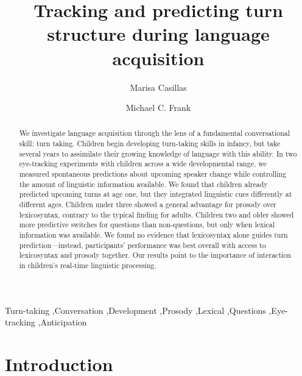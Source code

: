\documentclass[authoryear, 12pt]{elsarticle}
\begin{document}
\begin{frontmatter}

\title{Tracking and predicting turn structure during language acquisition}

\author[MPI]{Marisa Casillas}
\address[MPI]{Max Planck Institute for Psycholinguistics, Nijmegen}

\author[StanfordPSY]{Michael C. Frank}

\address[StanfordPSY]{Department of Psychology, Stanford University}

\begin{abstract}
We investigate language acquisition through the lens of a fundamental conversational skill: turn taking. Children begin developing turn-taking skills in infancy, but take several years to assimilate their growing knowledge of language with this ability. In two eye-tracking experiments with children across a wide developmental range, we measured spontaneous predictions about upcoming speaker change while controlling the amount of linguistic information available. We found that children already predicted upcoming turns at age one, but they integrated linguistic cues differently at different ages. Children under three showed a general advantage for prosody over lexicosyntax, contrary to the typical finding for adults. Children two and older showed more predictive switches for questions than non-questions, but only when lexical information was available. We found no evidence that lexicosyntax alone guides turn prediction---instead, participants' performance was best overall with access to lexicosyntax and prosody together. Our results point to the importance of interaction in children's real-time linguistic processing.
\end{abstract}

\begin{keyword}
Turn-taking \sep Conversation \sep Development \sep Prosody \sep Lexical \sep Questions \sep Eye-tracking \sep Anticipation

\end{keyword}

\end{frontmatter}


\section{Introduction}
\label{sec:intro}
\end{document}
